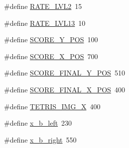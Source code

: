 \begin{DoxyCompactItemize}
\#define \mbox{\hyperlink{group__game_ga53f5b2e837f82146bdbbfcbe864a3787}{R\+A\+T\+E\+\_\+\+L\+V\+L2}}~15
\item 
\#define \mbox{\hyperlink{group__game_gad8d89481d86fee32a968b72da932456d}{R\+A\+T\+E\+\_\+\+L\+V\+L13}}~10
\item 
\#define \mbox{\hyperlink{group__game_ga43ac83d9bacb381715d00f2d81869c81}{S\+C\+O\+R\+E\+\_\+\+Y\+\_\+\+P\+OS}}~100
\item 
\#define \mbox{\hyperlink{group__game_ga52fa9d2055cff71b5a6fbdaef721dad0}{S\+C\+O\+R\+E\+\_\+\+X\+\_\+\+P\+OS}}~700
\item 
\#define \mbox{\hyperlink{group__game_ga1943a6fd02085a111e2e228b6c8257c8}{S\+C\+O\+R\+E\+\_\+\+F\+I\+N\+A\+L\+\_\+\+Y\+\_\+\+P\+OS}}~510
\item 
\#define \mbox{\hyperlink{group__game_ga0798d3f568ec40fefb913cf04738fe38}{S\+C\+O\+R\+E\+\_\+\+F\+I\+N\+A\+L\+\_\+\+X\+\_\+\+P\+OS}}~400
\item 
\#define \mbox{\hyperlink{group__game_ga3d9c227aaa4ac1d98dfb5f13af4106f2}{T\+E\+T\+R\+I\+S\+\_\+\+I\+M\+G\+\_\+X}}~400
\item 
\#define \mbox{\hyperlink{group__game_ga443a6b6a37a38501a81ab30095410ac1}{x\+\_\+b\+\_\+left}}~230
\item 
\#define \mbox{\hyperlink{group__game_gaf01c6e35b7b83fe4f9365249f997e26c}{x\+\_\+b\+\_\+right}}~550
\end{DoxyCompactItemize}
